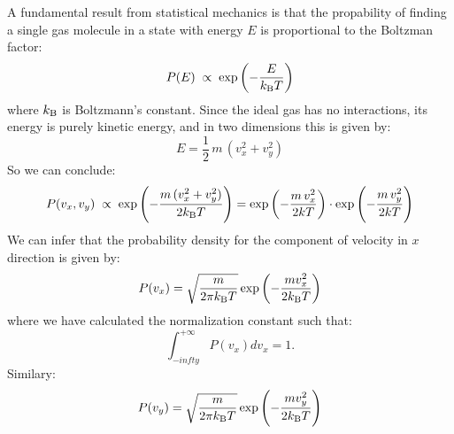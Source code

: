 {A fundamental result from statistical mechanics is that the
propability of finding a single gas molecule in a state with energy
$E$ is proportional to the Boltzman factor:
\begin{displaymath}
P(E) \; \propto \; \exp\left(-\frac{E}{k_{\rm B}T}\right)
\end{displaymath}
where $k_{\rm B}$ is Boltzmann's constant.  Since the ideal gas has no
interactions, its energy is purely kinetic energy, and in two
dimensions this is given by:
\begin{displaymath}
E = \frac{1}{2} \, m \, (v_x^2 + v_y^2)
\end{displaymath}
So we can conclude:
\begin{displaymath}
P(v_x, v_y) \; \propto \; \exp\left(-\frac{m\,(v_x^2+v_y^2)}{2k_{\rm B}T}\right)
=
\exp\left(-\frac{m\,v_x^2}{2kT}\right) \cdot \exp\left(-\frac{m\,v_y^2}{2kT}\right)
\end{displaymath}
We can infer that the probability density for the component of velocity in $x$ direction is given by:
\begin{equation}
  \label{eqn:mbvx}
P(v_x) = \sqrt{\frac{m}{2 \pi k_{\rm B} T}} \exp\left(-\frac{m v_x^2}{2k_{\rm B} T}\right)
\end{equation}
where we have calculated the normalization constant such that:
\begin{equation*}
\int_{-infty}^{+\infty} P(v_x) dv_x = 1.
\end{equation*}
Similary:
\begin{equation}
  \label{eqn:mbvy}
P(v_y) = \sqrt{\frac{m}{2 \pi k_{\rm B} T}} \exp\left(-\frac{m v_y^2}{2k_{\rm B} T}\right)
\end{equation}

}
